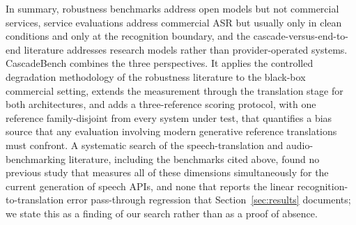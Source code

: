 In summary, robustness benchmarks address open models but not commercial
services, service evaluations address commercial ASR but usually only in
clean conditions and only at the recognition boundary, and the
cascade-versus-end-to-end literature addresses research models rather than
provider-operated systems. CascadeBench combines the three perspectives. It
applies the controlled degradation methodology of the robustness literature
to the black-box commercial setting, extends the measurement through the
translation stage for both architectures, and adds a three-reference scoring
protocol, with one reference family-disjoint from every system under test,
that quantifies a bias source that any evaluation involving modern
generative reference translations must confront. A systematic search of the speech-translation and
audio-benchmarking literature, including the benchmarks cited above, found
no previous study that measures all of these dimensions simultaneously for
the current generation of speech APIs, and none that reports the linear
recognition-to-translation error pass-through regression that
Section~\ref{sec:results} documents; we state this as a finding of our
search rather than as a proof of absence.
